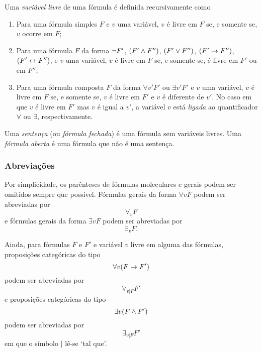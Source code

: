 Uma \emph{variável livre} de uma fórmula é definida recursivamente como
	\begin{enumerate}
	\item Para uma fórmula simples $F$ e $v$ uma variável, $v$ é livre em $F$ se, e somente se, $v$ ocorre em $F$;

	\item Para uma fórmula $F$ da forma $\lnot F'$, $(F' \land F'')$, $(F' \lor F'')$, $(F' \rightarrow F'')$, $(F' \leftrightarrow F'')$, e $v$ uma variável, $v$ é livre em $F$ se, e somente se, é livre em $F'$ ou em $F''$;

	\item Para uma fórmula composta $F$ da forma $\forall v' F'$ ou $\exists v' F'$ e $v$ uma variável, $v$ é livre em $F$ se, e somente se, $v$ é livre em $F'$ e $v$ é diferente de $v'$. No caso em que $v$ é livre em $F'$ mas $v$ é igual a $v'$, a variável $v$ está \emph{ligada} ao quantificador $\forall$ ou $\exists$, respectivamente.
	\end{enumerate}

Uma \emph{sentença} (ou \emph{fórmula fechada}) é uma fórmula sem variáveis livres. Uma \emph{fórmula aberta} é uma fórmula que não é uma sentença.

\subsubsection{Abreviações}

Por simplicidade, os parênteses de fórmulas moleculares e gerais podem ser omitidos sempre que possível. Fórmulas gerais da forma $\forall v F$ podem ser abreviadas por
	\begin{equation*}
	\forall_v F
	\end{equation*}
e fórmulas gerais da forma $\exists v F$ podem ser abreviadas por
	\begin{equation*}
	\exists_v F.
	\end{equation*}

Ainda, para fórmulas $F$ e $F'$ e variável $v$ livre em alguma das fórmulas, proposições categóricas do tipo
	\begin{equation*}
	\forall v(F \rightarrow F')
	\end{equation*}
podem ser abreviadas por
	\begin{equation*}
	\forall_{v | F} F'
	\end{equation*}
e proposições categóricas do tipo
	\begin{equation*}
	\exists v(F \land F')
	\end{equation*}
podem ser abreviadas por
	\begin{equation*}
	\exists_{v | F} F'
	\end{equation*}
em que o símbolo $|$ lê-se `tal que'.

